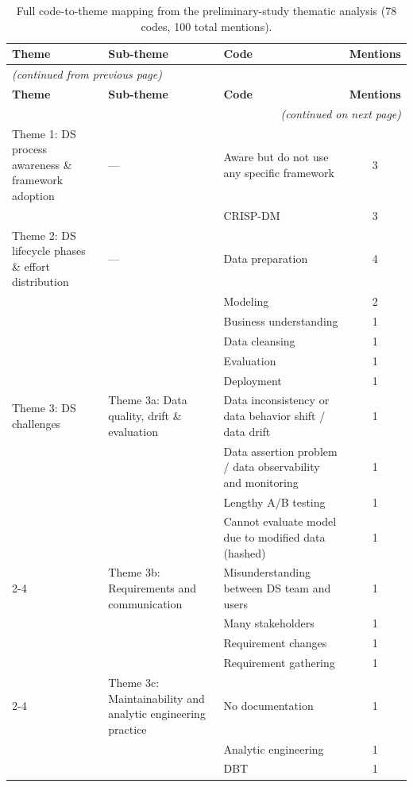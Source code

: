\documentclass[11pt]{article}
\begin{document}
\begin{longtable}{@{}p{3.5cm} p{3.5cm} p{6.0cm} c@{}}
\caption{Full code-to-theme mapping from the preliminary-study thematic analysis (78 codes, 100 total mentions).}
\label{tab:supp_codes} \\
\toprule
\textbf{Theme} & \textbf{Sub-theme} & \textbf{Code} & \textbf{Mentions} \\
\midrule
\endfirsthead
\multicolumn{4}{l}{\textit{(continued from previous page)}} \\
\toprule
\textbf{Theme} & \textbf{Sub-theme} & \textbf{Code} & \textbf{Mentions} \\
\midrule
\endhead
\midrule
\multicolumn{4}{r}{\textit{(continued on next page)}} \\
\endfoot
\bottomrule
\endlastfoot

Theme 1: DS process awareness \& framework adoption & ---
  & Aware but do not use any specific framework & 3 \\
   &
  & CRISP-DM & 3 \\
\midrule

Theme 2: DS lifecycle phases \& effort distribution & ---
  & Data preparation & 4 \\
   &
  & Modeling & 2 \\
   &
  & Business understanding & 1 \\
   &
  & Data cleansing & 1 \\
   &
  & Evaluation & 1 \\
   &
  & Deployment & 1 \\
\midrule

Theme 3: DS challenges
  & Theme 3a: Data quality, drift \& evaluation
  & Data inconsistency or data behavior shift / data drift & 1 \\
   &
  & Data assertion problem / data observability and monitoring & 1 \\
   &
  & Lengthy A/B testing & 1 \\
   &
  & Cannot evaluate model due to modified data (hashed) & 1 \\
\cmidrule(lr){2-4}
  & Theme 3b: Requirements and communication
  & Misunderstanding between DS team and users & 1 \\
   &
  & Many stakeholders & 1 \\
   &
  & Requirement changes & 1 \\
   &
  & Requirement gathering & 1 \\
\cmidrule(lr){2-4}
  & Theme 3c: Maintainability and analytic engineering practice
  & No documentation & 1 \\
   &
  & Analytic engineering & 1 \\
   &
  & DBT & 1 \\
\midrule


\end{longtable}
\end{document}
